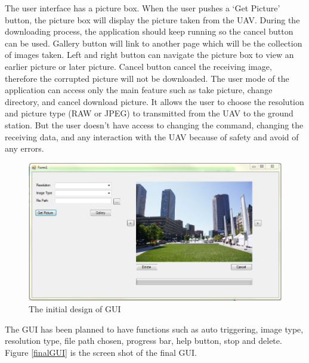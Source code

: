The user interface has a picture box. 
When the user pushes a ‘Get Picture’ button, the picture box will display the picture taken from the UAV. 
During the downloading process, the application should keep running so the cancel button can be used. 
Gallery button will link to another page which will be the collection of images taken. 
Left and right button can navigate the picture box to view an earlier picture or later picture. 
Cancel button cancel the receiving image, therefore the corrupted picture will not be downloaded. 
The user mode of the application can access only the main feature such as take picture, change directory, and cancel download picture.  
It allows the user to choose the resolution and picture type (RAW or JPEG) to transmitted from the UAV to the ground station. But the user doesn't have access to changing the command, changing the receiving data, and any interaction with the UAV because of safety and avoid of any errors. 
\begin{figure}[H]
\begin{center}
\includegraphics[width=1.0\textwidth]{figures/initialGUI.png} 
\end{center}
\caption{The initial design of GUI\label{ini_GUI}}
\end{figure}
The GUI has been planned to have functions such as auto triggering, image type, resolution type, file path chosen, progress bar, help button, stop and delete. Figure \ref{finalGUI} is the screen shot of the final GUI.

